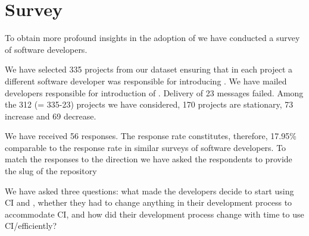 \section{Survey}
\label{sec:survey}
To obtain more profound insights in the adoption of \Tvis we have conducted a survey of software developers.

We have  selected 335 projects from our dataset ensuring that in each project a different software  developer was responsible for introducing \Tvis. 
We have mailed developers responsible for introduction of \Tvis. Delivery of 23 messages failed.
Among the 312 (= 335-23) projects we have considered, 170 projects are stationary, 73 increase and 69 decrease.

We have received 56 responses.  
The response rate constitutes, therefore, 17.95\% comparable to the response rate in similar surveys of \GH software developers.
To match the responses to the direction  we have asked the respondents to provide the slug of the \GH repository 

We have asked three questions: what made the developers decide to start using CI and \Tvis, whether they had to change anything in their development process to accommodate CI, and how did their development process change with time to use CI/\Tvis efficiently?
